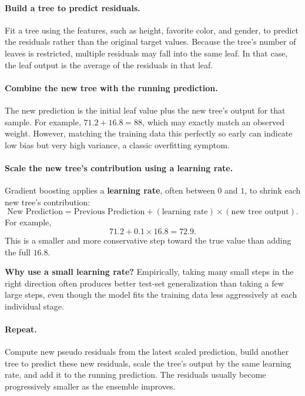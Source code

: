 \documentclass[12pt,openany]{book}
\begin{document}
\paragraph{Build a tree to predict residuals.}
Fit a tree using the features, such as height, favorite color, and gender, to predict the residuals rather than the original target values. Because the tree's number of leaves is restricted, multiple residuals may fall into the same leaf. In that case, the leaf output is the average of the residuals in that leaf.

\paragraph{Combine the new tree with the running prediction.}
The new prediction is the initial leaf value plus the new tree's output for that sample. For example, \(71.2+16.8=88\), which may exactly match an observed weight. However, matching the training data this perfectly so early can indicate low bias but very high variance, a classic overfitting symptom.

\paragraph{Scale the new tree's contribution using a learning rate.}
Gradient boosting applies a \textbf{learning rate}, often between \(0\) and \(1\), to shrink each new tree's contribution:
\begin{equation*}
    \text{New Prediction}
    = \text{Previous Prediction}
    + (\text{learning rate})\times(\text{new tree output}).
\end{equation*}
For example,
\begin{equation*}
    71.2 + 0.1\times 16.8 = 72.9.
\end{equation*}
This is a smaller and more conservative step toward the true value than adding the full \(16.8\).

\textbf{Why use a small learning rate?} Empirically, taking many small steps in the right direction often produces better test-set generalization than taking a few large steps, even though the model fits the training data less aggressively at each individual stage.

\paragraph{Repeat.}
Compute new pseudo residuals from the latest scaled prediction, build another tree to predict these new residuals, scale the tree's output by the same learning rate, and add it to the running prediction. The residuals usually become progressively smaller as the ensemble improves.
\end{document}
